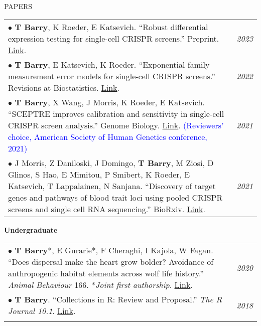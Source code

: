 \documentclass{resume} %
\begin{document}
\begin{rSection}{PAPERS}

\begin{tabular}{p{14cm}R{2.5cm}}
	$\bullet$ \textbf{T Barry}, K Roeder, E Katsevich. ``Robust differential expression testing for single-cell CRISPR screens.'' Preprint. \href{https://github.com/timothy-barry/timothy-barry.github.io/blob/master/sceptre_2_ms.pdf}{Link}. & \textit{2023} \\
	
	$\bullet$ \textbf{T Barry}, E Katsevich, K Roeder. “Exponential family measurement error models for single-cell CRISPR screens.” Revisions at Biostatistics. \href{https://arxiv.org/abs/2201.01879}{Link}. & \textit{2022} \\
	 
	$\bullet$ \textbf{T Barry}, X Wang, J Morris, K Roeder, E Katsevich. ``SCEPTRE improves calibration and sensitivity in single-cell CRISPR screen analysis.'' Genome Biology. \href{https://genomebiology.biomedcentral.com/articles/10.1186/s13059-021-02545-2}{Link}. \textcolor{blue}{(Reviewers’ choice, American Society of Human Genetics conference, 2021)} 
	& \textit{2021}  
	\\
	$\bullet$ J Morris, Z Daniloski, J Domingo, \textbf{T Barry}, M Ziosi, D Glinos, S Hao, E Mimitou, P Smibert, K Roeder, E Katsevich, T Lappalainen, N Sanjana. “Discovery of target genes and pathways of blood trait loci using pooled CRISPR screens and single cell RNA sequencing.” BioRxiv. \href{https://www.biorxiv.org/content/10.1101/2021.04.07.438882v1}{Link}.  & \textit{2021} \\
\end{tabular} 

\textbf{Undergraduate}

\begin{tabular}{p{14cm}R{2.5cm}}
	$\bullet$ \textbf{T Barry}*, E Gurarie*, F Cheraghi, I Kajola, W Fagan. ``Does dispersal make the heart grow bolder? Avoidance of anthropogenic habitat elements across wolf life history.'' \textit{Animal Behaviour} 166. *\textit{Joint first authorship}. \href{https://www.sciencedirect.com/science/article/pii/S0003347220301743}{Link}. & \textit{2020}  \\
	$\bullet$ \textbf{T Barry}. ``Collections in R: Review and Proposal.'' \textit{The R Journal 10.1}. \href{https://journal.r-project.org/archive/2018/RJ-2018-037/index.html}{Link}. & \textit{2018} \\ &
\end{tabular} 	
\end{rSection}
\end{document}
